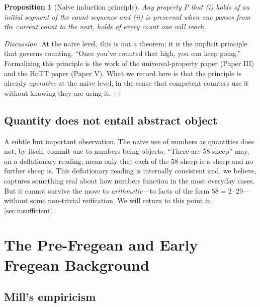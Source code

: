 \documentclass[12pt]{article}
\newtheorem{proposition}[theorem]{Proposition}
\theoremstyle{definition}
\theoremstyle{remark}
\begin{document}
\begin{proposition}[Naive induction principle]
\label{prop:naive-induction}
Any property $P$ that (i) holds of an initial segment of the count
sequence and (ii) is preserved when one passes from the current count to
the next, holds of every count one will reach.
\end{proposition}

\begin{proof}[Discussion]
At the naive level, this is not a theorem; it is the implicit principle
that governs counting. ``Once you've counted that high, you can keep
going.'' Formalizing this principle is the work of the universal-property
paper (Paper III) and the HoTT paper (Paper V). What we record here is
that the principle is already \emph{operative} at the naive level, in the
sense that competent counters use it without knowing they are using it.
\end{proof}

\subsection{Quantity does not entail abstract object}

A subtle but important observation. The naive use of numbers as quantities
does not, by itself, commit one to numbers being objects. ``There are 58
sheep'' may, on a deflationary reading, mean only that each of the 58
sheep is a sheep and no further sheep is. This deflationary reading is
internally consistent and, we believe, captures something real about how
numbers function in the most everyday cases. But it cannot survive the
move to \emph{arithmetic}---to facts of the form $58 = 2 \cdot 29$---without
some non-trivial reification. We will return to this point in
\cref{sec:insufficient}.

\section{The Pre-Fregean and Early Fregean Background}
\label{sec:pre-fregean}

\subsection{Mill's empiricism}
\end{document}
